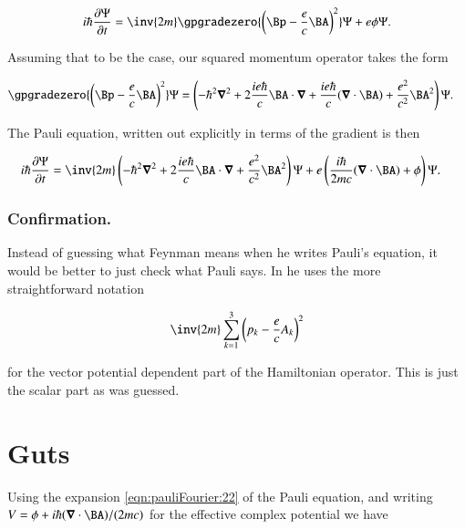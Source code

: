 \begin{align}\label{eqn:pauliFourier:1c}
i \hbar \PD{t}{\Psi} = \inv{2m} \gpgradezero{ \left( \Bp - \frac{e}{c} \BA \right)^2 } \Psi + e \phi \Psi.
\end{align}

Assuming that to be the case, our squared momentum operator takes the form

\begin{align}\label{eqn:pauliFourier:21}
\gpgradezero{ \left( \Bp - \frac{e}{c} \BA \right)^2 } \Psi 
&=
\left( - \hbar^2 \spacegrad^2 + 2 
\frac{i e \hbar }{c}
\BA \cdot \spacegrad 
+ 
\frac{i e \hbar }{c}
(\spacegrad \cdot \BA) 
+ 
\frac{e^2}{c^2} \BA^2 \right) \Psi.
\end{align}

The Pauli equation, written out explicitly in terms of the gradient is then

\begin{align}\label{eqn:pauliFourier:22}
i \hbar \PD{t}{\Psi} 
&= 
\inv{2m} 
\left( - \hbar^2 \spacegrad^2 + 2 
\frac{i e \hbar }{c}
\BA \cdot \spacegrad 
+ 
\frac{e^2}{c^2} \BA^2 \right) \Psi
+
e \left( \frac{i \hbar }{ 2 m c} (\spacegrad \cdot \BA) + \phi \right) \Psi.
\end{align}

\subsubsection{Confirmation.}

Instead of guessing what Feynman means when he writes Pauli's equation, it would be better to just check what Pauli says.  In \cite{pauli2000wm} he uses the more straightforward notation

\begin{align}\label{eqn:pauliFourier:25}
\inv{2m} \sum_{k=1}^3 \left( p_k - \frac{e}{c}A_k \right)^2
\end{align}

for the vector potential dependent part of the Hamiltonian operator.  This is just the scalar part as was guessed.

\section{Guts}

Using the expansion \ref{eqn:pauliFourier:22} of the Pauli equation, and writing $V = \phi + i \hbar (\spacegrad \cdot \BA)/ (2 m c)$ for the effective complex potential we have

